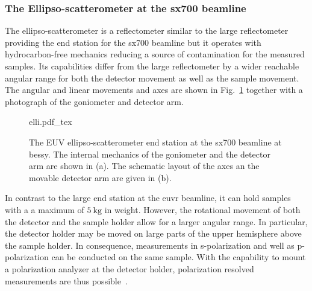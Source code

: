 \subsubsection{The Ellipso-scatterometer at the \gls{sx700} beamline}
The ellipso-scatterometer is a reflectometer similar to the large reflectometer providing the end station for the \gls{sx700} beamline but it operates with hydrocarbon-free mechanics reducing a source of contamination for the measured samples. Its capabilities differ from the large reflectometer by a wider reachable angular range for both the detector movement as well as the sample movement. The angular and linear movements and axes are shown in Fig.~\ref{ch_exp:fig_elli} together with a photograph of the goniometer and detector arm.
\begin{figure}[htb]
    \def\svgwidth{\textwidth}
    {elli.pdf_tex}
    \caption[The EUV ellipso-scatterometer end station at the SX700 beamline.]{The EUV ellipso-scatterometer end station at the \gls{sx700} beamline at \gls{bessy}. The internal mechanics of the goniometer and the detector arm are shown in (a). The schematic layout of the axes an the movable detector arm are given in (b).}
    \label{ch_exp:fig_elli}
\end{figure}
In contrast to the large end station at the \gls{euvr} beamline, it can hold samples with a a maximum of $\SI{5}{\kg}$ in weight. However, the rotational movement of both the detector and the sample holder allow for a larger angular range. In particular, the detector holder may be moved on large parts of the upper hemisphere above the sample holder. In consequence, measurements in s-polarization and well as p-polarization can be conducted on the same sample. With the capability to mount a polarization analyzer at the detector holder, polarization resolved measurements are thus possible~\cite{soltwisch_polarization_2015}.

